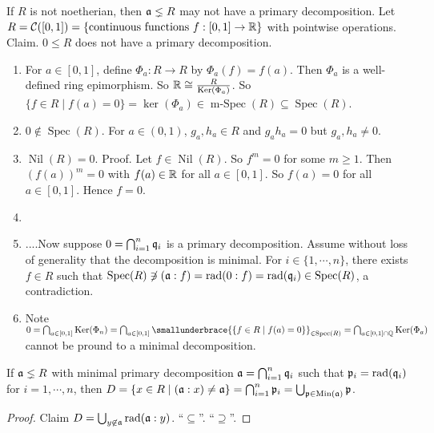 \begin{example}
    If $R$ is not noetherian, then $\mathfrak{a} \lneq R$ may not have a primary decomposition. Let $R = \mathcal{C}([0,1]) = \{\text{continuous functions }f: [0,1] \to \mathbb{R}\}$ with pointwise operations. Claim. $0 \leq R$ does not have a primary decomposition.
    \begin{enumerate}
        \item For $a \in [0,1]$, define $\Phi_a: R \to R$ by $\Phi_a(f) = f(a)$. Then $\Phi_a$ is a well-defined ring epimorphism. So $\mathbb{R} \cong \frac{R}{\operatorname{Ker}(\Phi_a)}$. So $\{f \in R \mid f(a) = 0\} = \ker(\Phi_a) \in \operatorname{m-Spec}(R) \subseteq \operatorname{Spec}(R)$.
        \item $0 \not \in \operatorname{Spec}(R)$. For $a \in (0,1)$, $g_a,h_a \in R$ and $g_ah_a = 0$ but $g_a,h_a \neq 0$.
        \item $\operatorname{Nil}(R) = 0$. Proof. Let $f \in \operatorname{Nil}(R)$. So $f^{m} = 0$ for some $m \geq 1$. Then $(f(a))^{m} = 0$ with $f(a) \in \mathbb{R}$ for all $a \in [0,1]$. So $f(a) = 0$ for all $a \in [0,1]$. Hence $f= 0$.
        \item 
        \item
            ....Now suppose $0 = \bigcap_{i=1}^{n}\mathfrak{q}_i$ is a primary decomposition. Assume without loss of generality that the decomposition is minimal. For $i \in \{1,\cdots,n\}$, there exists $f \in R$ such that $\operatorname{Spec}(R) \not \ni (\mathfrak{a}:f) = \operatorname{rad}(0:f) = \operatorname{rad}(\mathfrak{q}_i) \in \operatorname{Spec}(R)$, a contradiction. 
        \item Note $0 = \bigcap_{a \in [0,1]} \ker(\Phi_n) = \bigcap_{a \in [0,1]} \smallunderbrace{\{f \in R \mid f(a) = 0\}}_{\in \operatorname{Spec}(R)} = \bigcap_{a \in [0,1] \cap \bbQ} \ker(\Phi_a)$ cannot be pround to a minimal decomposition.
    \end{enumerate}
\end{example}

\begin{proposition}
    If $\mathfrak{a} \lneq R$ with minimal primary decomposition $\mathfrak{a} = \bigcap_{i=1}^{n} \mathfrak{q}_i$ such that $\mathfrak{p}_i = \operatorname{rad}(\mathfrak{q}_i)$ for $i = 1,\cdots,n$, then $D = \{x \in R \mid (\mathfrak{a}:x) \neq \mathfrak{a}\} = \bigcap_{i=1}^{n} \mathfrak{p}_i = \bigcup_{\mathfrak{p} \in \operatorname{Min}(\mathfrak{a})} \mathfrak{p}$.
\end{proposition}

\begin{proof}
    Claim $D = \bigcup_{y \not\in \mathfrak{a}} \operatorname{rad}(\mathfrak{a}:y)$. ``$\subseteq$''. ``$\supseteq$''.
\end{proof}

